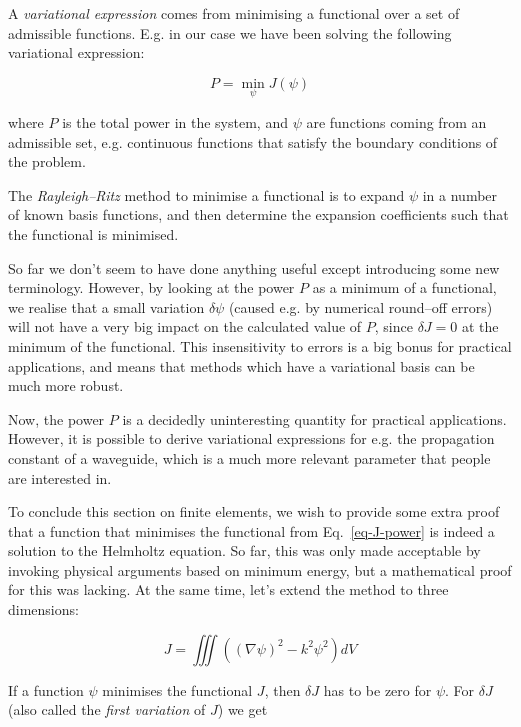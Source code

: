 A \emph{variational expression} comes from minimising a functional over a set of admissible functions. E.g. in our case we have been solving the following variational expression:

\begin{equation}
P = \min_\psi J(\psi)
\end{equation} 

where $P$ is the total power in the system, and $\psi$ are functions coming from an admissible set, e.g. continuous functions that satisfy the boundary conditions of the problem.

The \emph{Rayleigh--Ritz} method to minimise a functional is to expand $\psi$ in a number of known basis functions, and then determine the expansion coefficients such that the functional is minimised.

So far we don't seem to have done anything useful except introducing some new terminology. However, by looking at the power $P$ as a minimum of a functional, we realise that a small variation $\delta \psi$ (caused e.g. by numerical round--off errors) will not have a very big impact on the calculated value of $P$, since $\delta J=0$ at the minimum of the functional. This insensitivity to errors is a big bonus for practical applications, and means that methods which have a variational basis can be much more robust.

Now, the power $P$ is a decidedly uninteresting quantity for practical applications. However, it is possible to derive variational expressions for e.g. the propagation constant of a waveguide, which is a much more relevant parameter that people are interested in.

To conclude this section on finite elements, we wish to provide some extra proof that a function that minimises the functional from Eq.~\ref{eq-J-power} is indeed a solution to the Helmholtz equation. So far, this was only made acceptable by invoking physical arguments based on minimum energy, but a mathematical proof for this was lacking. At the same time, let's extend the method to three dimensions:

\begin{equation}
J = \iiint \left((\nabla \psi)^2 - k^2 \psi^2 \right) dV \label{eq-variational1}
\end{equation} 

If a function $\psi$ minimises the functional $J$, then $\delta J$ has to be zero for $\psi$. For $\delta J$ (also called the \emph{first variation} of $J$) we get

